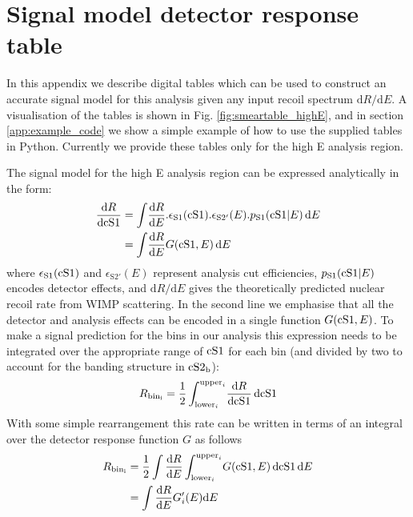 \section{Signal model detector response table}

In this appendix we describe digital tables which can be used to construct an accurate signal model for this analysis given any input recoil spectrum $\mathrm{d}R/\mathrm{d}E$. A visualisation of the tables is shown in Fig. \ref{fig:smeartable_highE}, and in section \ref{app:example_code} we show a simple example of how to use the supplied tables in Python. Currently we provide these tables only for the high E analysis region.

The signal model for the high E analysis region can be expressed analytically in the form:
%
\begin{align}
\label{eq:high2D}
  \frac{\mathrm{d} R}{\mathrm{d}\mathrm{cS1}} &= \int \! \frac{\mathrm{d}R}{\mathrm{d}E}.\epsilon_\mathrm{S1}(\mathrm{cS1}) .\epsilon_\mathrm{S2'}(E).p_\mathrm{S1}(\mathrm{\mathrm{cS1}}|E) \, \mathrm{d}E \\
  &= \int \! \frac{\mathrm{d}R}{\mathrm{d}E} G(\mathrm{cS1},E) \, \mathrm{d}E
\end{align}
%
where $\epsilon_\mathrm{S1}(\mathrm{cS1})$ and $\epsilon_\mathrm{S2'}(E)$ represent analysis cut efficiencies, $p_\mathrm{S1}(\mathrm{\mathrm{cS1}}|E)$ encodes detector effects, and $\mathrm{d}R/\mathrm{d}E$ gives the theoretically predicted nuclear recoil rate from WIMP scattering. In the second line we emphasise that all the detector and analysis effects can be encoded in a single function $G(\mathrm{cS1},E)$. To make a signal prediction for the bins in our analysis this expression needs to be integrated over the appropriate range of $\mathrm{cS1}$ for each bin (and divided by two to account for the banding structure in $\mathrm{cS2}_\mathrm{b}$):
%
\begin{equation}
  R_\mathrm{bin_i} = \frac{1}{2}\int_{\mathrm{lower}_i}^{\mathrm{upper}_i} \! \frac{\mathrm{d} R}{\mathrm{d}\mathrm{cS1}} \, \mathrm{d}\mathrm{cS1}
\end{equation}
%
With some simple rearrangement this rate can be written in terms of an integral over the detector response function $G$ as follows
%
\begin{align}
  R_\mathrm{bin_i} &= \frac{1}{2}\int\frac{\mathrm{d} R}{\mathrm{d}E}\int_{\mathrm{lower}_i}^{\mathrm{upper}_i} \! G(\mathrm{cS1},E) \, \mathrm{d}\mathrm{cS1} \, \mathrm{d}E \\
 &= \int\frac{\mathrm{d} R}{\mathrm{d}E} G'_i(E) \mathrm{d}E
\end{align}
%

